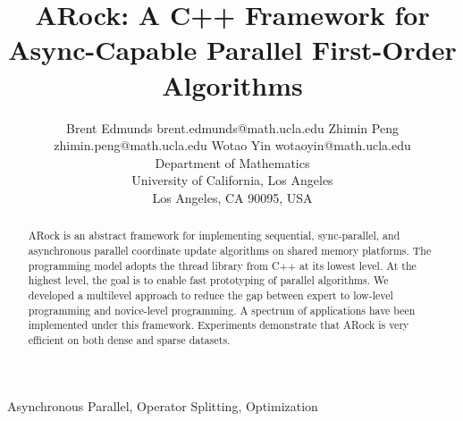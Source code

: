 \documentclass[twoside,11pt]{article}
\begin{document}
\title{ARock: A C++ Framework for Async-Capable Parallel First-Order Algorithms}

\author{\name Brent Edmunds \email brent.edmunds@math.ucla.edu
       \AND
       \name Zhimin Peng \email zhimin.peng@math.ucla.edu
       \AND
	\name Wotao Yin \email wotaoyin@math.ucla.edu \\
       \addr Department of Mathematics\\
       University of California, Los Angeles\\
       Los Angeles, CA 90095, USA}	

\maketitle

\begin{abstract}
ARock is an abstract framework for implementing sequential, sync-parallel, and asynchronous parallel coordinate update algorithms on shared memory platforms. 
The programming model adopts the thread library from C++ at its lowest level. At the highest level, the goal is to enable fast prototyping of parallel algorithms. 
We developed a multilevel approach to reduce the gap between expert to low-level programming and novice-level programming. 
A spectrum of applications have been implemented under this framework. 
Experiments demonstrate that ARock is very efficient on both dense and sparse datasets. 
\end{abstract}

\begin{keywords}
  Asynchronous Parallel, Operator Splitting, Optimization
\end{keywords}








%

%

%


% 


% 







\end{document}
